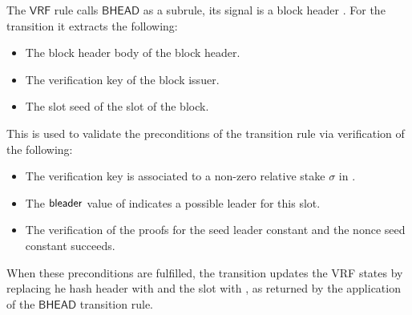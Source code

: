 The $\mathsf{VRF}$ rule calls $\mathsf{BHEAD}$ as a subrule, its signal is a
block header . For the transition it extracts the following:

\begin{itemize}
\item The block header body  of the block header.
\item The verification key  of the block issuer.
\item The slot seed  of the slot of the block.
\end{itemize}

This is used to validate the preconditions of the transition rule via
verification of the following:

\begin{itemize}
\item The verification key is associated to a non-zero relative stake
  $\sigma$ in .
\item The $\mathsf{bleader}$ value of  indicates a possible leader for
  this slot.
\item The verification of the proofs for the seed leader constant \var{\Seedl}
  and the nonce seed constant \var{\Seede} succeeds.
\end{itemize}

When these preconditions are fulfilled, the transition updates the VRF states by
replacing he hash header with  and the slot with , as
returned by the application of the $\mathsf{BHEAD}$ transition rule.

